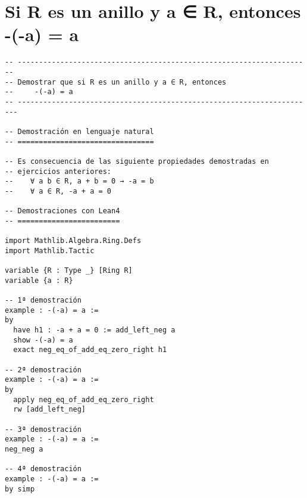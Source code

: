 \section{Si R es un anillo y a ∈ R, entonces -(-a) = a}
\label{sec:org0d22fab}
\begin{verbatim}
-- ---------------------------------------------------------------------
-- Demostrar que si R es un anillo y a ∈ R, entonces
--     -(-a) = a
-- ----------------------------------------------------------------------

-- Demostración en lenguaje natural
-- ================================

-- Es consecuencia de las siguiente propiedades demostradas en
-- ejercicios anteriores:
--    ∀ a b ∈ R, a + b = 0 → -a = b
--    ∀ a ∈ R, -a + a = 0

-- Demostraciones con Lean4
-- ========================

import Mathlib.Algebra.Ring.Defs
import Mathlib.Tactic

variable {R : Type _} [Ring R]
variable {a : R}

-- 1ª demostración
example : -(-a) = a :=
by
  have h1 : -a + a = 0 := add_left_neg a
  show -(-a) = a
  exact neg_eq_of_add_eq_zero_right h1

-- 2ª demostración
example : -(-a) = a :=
by
  apply neg_eq_of_add_eq_zero_right
  rw [add_left_neg]

-- 3ª demostración
example : -(-a) = a :=
neg_neg a

-- 4ª demostración
example : -(-a) = a :=
by simp
\end{verbatim}





